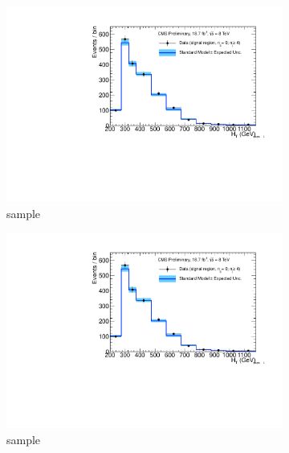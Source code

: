 \begin{figure}[h!]
\begin{subfigure}[b]{0.48\textwidth}
    \includegraphics[width=\textwidth,page=4]
    {Figs/results/v0/blueBand/bestFit_2012dev_RQcdZero_fZinvAll_0b_ge4j-12hp_smOnly}
    \caption{\mj sample}
  \end{subfigure}
  \begin{subfigure}[b]{0.48\textwidth}
    \includegraphics[width=\textwidth,page=8]
    {Figs/results/v0/blueBand/bestFit_2012dev_RQcdZero_fZinvAll_0b_ge4j-12hp_smOnly}
    \caption{\mmj sample}
  \end{subfigure}\\
  \begin{subfigure}[b]{0.48\textwidth}

\end{subfigure}
\end{figure}
